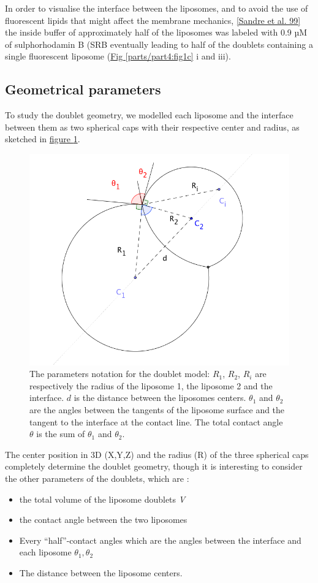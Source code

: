 \documentclass[A4paperpaper,11pt,english]{sphinxmanual}
\begin{document}
In order to visualise the interface between the liposomes, and to avoid the use of fluorescent
lipids that might affect the membrane mechanics, {\hyperref[parts/part4:sandre1999]{{[}Sandre et al. 99{]}}} the inside
buffer of approximately half of the liposomes was labeled with 0.9 µM
of sulphorhodamin B (SRB
eventually leading to half of the doublets containing a single fluorescent liposome (\hyperref[parts/part4:fig1c]{Fig  \ref*{parts/part4:fig1c}} i and iii).


\subsection{Geometrical parameters}
\label{parts/part4:geometrical-parameters}
To study the doublet geometry, we modelled each liposome and the interface
between them as two spherical caps with their respective center and radius, as
sketched in \hyperref[parts/part4:fig-notations-doublets]{figure  \ref*{parts/part4:fig-notations-doublets}}.
\begin{figure}[htbp]
\centering
\capstart

\includegraphics[width=0.500\linewidth]{notations-doublets.png}
\caption{The parameters notation for the doublet model: \(R_1\), \(R_2\), \(R_i\) are respectively the
radius of the liposome 1, the liposome 2 and the interface. \(d\) is the
distance between the liposomes centers. \(\theta_1\) and \(\theta_2\) are the angles between
the tangents of the liposome surface and the tangent to the interface at the
contact line. The total contact angle \(\theta\) is the sum of \(\theta_1\) and \(\theta_2\).}\label{parts/part4:fig-notations-doublets}\end{figure}

The center position in 3D (X,Y,Z) and the radius (R) of the three spherical caps
completely determine the doublet geometry, though it is interesting to consider the other
parameters of the doublets, which are :
\begin{itemize}
\item {} 
the total volume of the liposome doublets \emph{V}

\item {} 
the contact angle between the two liposomes

\item {} 
Every ``half''-contact angles which are the angles between the
interface and each liposome \(\theta_1,\theta_2\)

\item {} 
The distance between the liposome centers.

\end{itemize}
\end{document}
